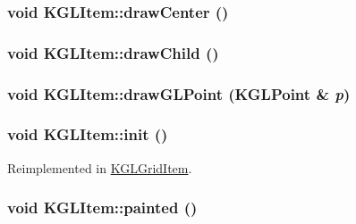\hypertarget{class_k_g_l_item_ff61febb3b171446aacf3c6c947fa475}{
\subsubsection[{drawCenter}]{\setlength{\rightskip}{0pt plus 5cm}void KGLItem::drawCenter ()}}
\label{class_k_g_l_item_ff61febb3b171446aacf3c6c947fa475}


\hypertarget{class_k_g_l_item_492b385411549f646d1278db59706779}{
\subsubsection[{drawChild}]{\setlength{\rightskip}{0pt plus 5cm}void KGLItem::drawChild ()}}
\label{class_k_g_l_item_492b385411549f646d1278db59706779}


\hypertarget{class_k_g_l_item_1d33b3aacc34428bc199771a90b00bc0}{
\subsubsection[{drawGLPoint}]{\setlength{\rightskip}{0pt plus 5cm}void KGLItem::drawGLPoint ({\bf KGLPoint} \& {\em p})}}
\label{class_k_g_l_item_1d33b3aacc34428bc199771a90b00bc0}


\hypertarget{class_k_g_l_item_2227b986b72366e149815a5fa5838d52}{
\subsubsection[{init}]{\setlength{\rightskip}{0pt plus 5cm}void KGLItem::init ()}}
\label{class_k_g_l_item_2227b986b72366e149815a5fa5838d52}




Reimplemented in \hyperlink{class_k_g_l_grid_item_b86b8c2552de5956e79abb6b0ce81d73}{KGLGridItem}.\hypertarget{class_k_g_l_item_9a6bf78a4509a1e38fc7be170ea0003e}{
\subsubsection[{painted}]{\setlength{\rightskip}{0pt plus 5cm}void KGLItem::painted ()}}
\label{class_k_g_l_item_9a6bf78a4509a1e38fc7be170ea0003e}


